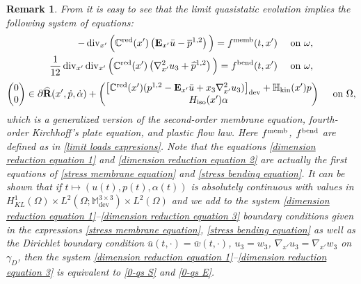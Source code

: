 \documentclass[reqno,10pt]{amsart}
\numberwithin{equation}{section}
\newtheorem{remark}[theorem]{Remark}
\theoremstyle{remark}
\newcommand{\BLACK}{\color{black}}
\newcommand{\PINK}{\color{black}}
\newcommand{\C}{\mathbb{C}}
\newcommand{\M}{\mathbb{M}}
\DeclareMathOperator{\dev}{dev}
\renewcommand{\div}{\operatorname{div}}
\newcommand{\fvol}{f}
\newcommand{\fsurf}{g}
\newcommand{\zerothI}[1]{\overline{#1}}
\newcommand{\firstI}[1]{\widehat{#1}}
\newcommand{\E}{{\bf E}}
\newcommand{\D}{\nabla}
\newcommand{\Hkin}{\mathbb{H}_{\rm kin}}
\newcommand{\Hiso}{H_{\rm iso}}
\newcommand{\disspot}{\mathbf{R}}
\newcommand{\gendisspot}{\widehat{\disspot}}
\newcommand{\red}[1]{#1^{\rm red}}
\begin{document}
\begin{remark}
From \cite[Section 3.5]{Mielke.Roubicek.2015} it is easy to see that the limit quasistatic evolution implies the following system of equations:
\begin{align}
	-\div_{x'}\Big(\red{\C}(x')\left({\E}_{x'}\bar{u}-\zerothI{p}^{1,2}\right)\Big) 
	= f^{\rm memb}(t,x')
	\quad \text{ on } \omega, \label{dimension reduction equation 1}\\
	\frac{1}{12} \div_{x'}\div_{x'}\Big(\red{\C}(x')\left({\D}^2_{x'}u_3+\firstI{p}^{1,2}\right)\Big)
	= f^{\rm bend}(t,x')
	\quad \text{ on } \omega, \label{dimension reduction equation 2} 
\end{align}
\begin{equation} \label{dimension reduction equation 3}
	\begin{pmatrix}
		0 \\ 0
	\end{pmatrix}
	\in
	\partial\gendisspot(x', \dot{p}, \dot{\alpha})
	+ 
	\begin{pmatrix}
		\left[ \red{\C}(x')(p^{1,2}-{\E}_{x'}\bar{u}+x_3{\D}^2_{x'}u_3) \right]_{\dev} + \Hkin(x')p\\
		\Hiso(x')\alpha
	\end{pmatrix}
	\quad \text{ on } \Omega,
\end{equation}
which is a generalized version of the second-order membrane equation, fourth-order Kirchhoff's plate equation, and plastic flow law. 
{\PINK Here $f^{\rm memb}$, $f^{\rm bend}$ are defined as in \eqref{limit loads expresions}.\BLACK}
Note that the equations \eqref{dimension reduction equation 1} and \eqref{dimension reduction equation 2} are actually the first equations of \eqref{stress membrane equation} and \eqref{stress bending equation}. 
It can be shown that if $t \mapsto (u(t), p(t), \alpha(t))$ is absolutely continuous with values in $H^1_{KL}(\Omega) \times L^2(\Omega;\M^{3 \times 3}_{\dev}) \times L^2(\Omega)$ and we add to the system \eqref{dimension reduction equation 1}--\eqref{dimension reduction equation 3} boundary conditions given in the expressions \eqref{stress membrane equation}, \eqref{stress bending equation} as well as the Dirichlet boundary condition $\bar{u}(t,\cdot)=\bar{w}(t,\cdot)$, $ u_3=w_3$, $\nabla_{x'} u_3=\nabla_{x'} w_3$ on $\gamma_D$, then the system \eqref{dimension reduction equation 1}--\eqref{dimension reduction equation 3} is equivalent to \ref{0-qs S} and \ref{0-qs E}.
\end{remark}
\end{document}
